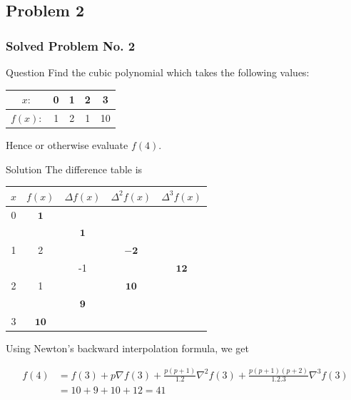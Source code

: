 \documentclass{beamer}
\begin{document}
\subsection{Problem 2}
\begin{frame}
\frametitle{Solved Problem No. 2}
\begin{block}{Question}
Find the cubic polynomial which takes the following values:
\begin{center}
\begin{tabular}{|c|c|c|c|c|}
\hline
$x:$ & 0 & 1 & 2 & 3 \\
\hline
$f(x):$ & 1 & 2 & 1 & 10 \\
\hline
\end{tabular}
\end{center}
Hence or otherwise evaluate $f(4)$.
\end{block}
\end{frame}

\begin{frame}{Solution}
The difference table is

\begin{center}
\begin{tabular}{|c|c|c|c|c|}
\hline
$x$ & $f(x)$ & $\Delta f(x)$ & $\Delta^{2} f(x)$ & $\Delta^{3} f(x)$ \\
\hline
0 & $\mathbf{1}$ &  &  &  \\
\hline
 &  & $\mathbf{1}$ &  &  \\
\hline
1 & 2 &  & $-\mathbf{2}$ &  \\
\hline
 &  & -1 &  & $\mathbf{1 2}$ \\
\hline
2 & 1 &  & $\mathbf{1 0}$ &  \\
\hline
 &  & $\mathbf{9}$ &  &  \\
\hline
3 & $\mathbf{1 0}$ &  &  &  \\
\hline
\end{tabular}
\end{center}
 Using Newton's backward interpolation formula, we get

$$
\begin{aligned}
f(4) & =f(3)+p \nabla f(3)+\frac{p(p+1)}{1.2} \nabla^{2} f(3)+\frac{p(p+1)(p+2)}{1.2 .3} \nabla^{3} f(3) \\
& =10+9+10+12=41
\end{aligned}
$$
\end{frame}
\end{document}
